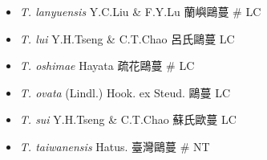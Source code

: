 \begin{itemize}
  \begin{itemize}
        \item[] \textit{T. lanyuensis} Y.C.Liu \& F.Y.Lu  蘭嶼鷗蔓  \# LC
        \item[] \textit{T. lui} Y.H.Tseng \& C.T.Chao  呂氏鷗蔓   LC
        \item[] \textit{T. oshimae} Hayata  疏花鷗蔓  \# LC
        \item[] \textit{T. ovata} (Lindl.) Hook. ex Steud.  鷗蔓   LC
        \item[] \textit{T. sui} Y.H.Tseng \& C.T.Chao  蘇氏歐蔓   LC
        \item[] \textit{T. taiwanensis} Hatus.  臺灣鷗蔓  \# NT
  \end{itemize}
  \end{itemize}
